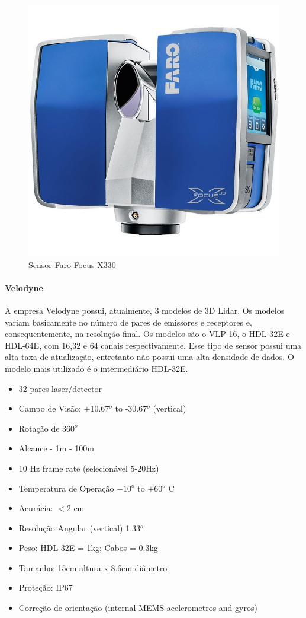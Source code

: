 \begin{figure}[h!]
	\includegraphics[width=0.6\columnwidth]{detail/figs/3dsensors/faro}
	\caption{Sensor Faro Focus X330}
    \label{fig::faro_focus}
\end{figure}


\paragraph{Velodyne}

A empresa Velodyne possui, atualmente, 3 modelos de 3D Lidar. Os modelos variam
basicamente no número de pares de emissores e receptores e, consequentemente, na
resolução final. Os modelos são o VLP-16, o HDL-32E e HDL-64E, com 16,32 e 64
canais respectivamente. Esse tipo de sensor possui uma alta taxa de
atualização, entretanto não possui uma alta densidade de dados. O modelo mais
utilizado é o intermediário HDL-32E.

\begin{itemize}
\item 32 pares laser/detector  
\item Campo de Visão: +10.67$^o$ to -30.67$^o$ (vertical)
\item Rotação de $360^o$
\item Alcance - 1m - 100m 
\item 10 Hz frame rate (selecionável 5-20Hz)
\item Temperatura de Operação $-10^o$ to $+60^o$ C
\item Acurácia: $<$2 cm
\item Resolução Angular (vertical) 1.33$^o$
\item Peso: HDL-32E = 1kg; Cabos = 0.3kg
\item Tamanho: 15cm altura x 8.6cm diâmetro
\item Proteção: IP67
\item Correção de orientação (internal MEMS acelerometros and gyros)
\end{itemize}

